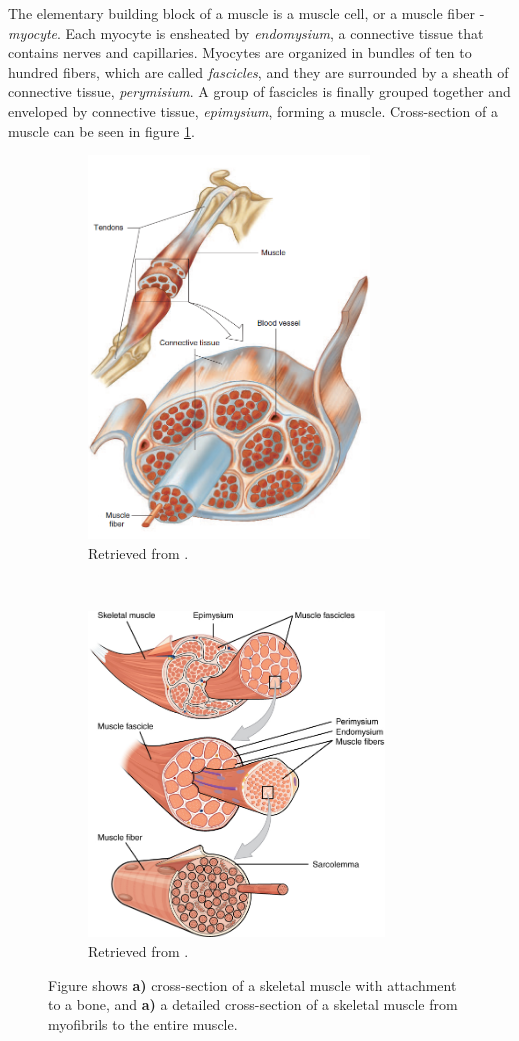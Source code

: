 The elementary building block of a muscle is a muscle cell, or a muscle fiber - \emph{myocyte}. Each myocyte is ensheated by \emph{endomysium}, a connective tissue that contains nerves and capillaries. Myocytes are organized in bundles of ten to hundred fibers, which are called \emph{fascicles}, and they are surrounded by a sheath of connective tissue, \emph{perymisium}. A group of fascicles is finally grouped together and enveloped by connective tissue, \emph{epimysium}, forming a muscle. Cross-section of a muscle can be seen in figure \ref{fig:muscle}.
\begin{figure}[t!]
    \centering
    \begin{subfigure}[t]{0.49\textwidth}
        \centering
        \includegraphics[height=4in]{Images/introduction/muscle.png}
        \caption{Retrieved from \citet{Widmaier2014}.}
    \end{subfigure}%
    ~ 
    \begin{subfigure}[t]{0.49\textwidth}
        \centering
        \includegraphics[height=3.4in]{Images/introduction/Muscle_Fibers.png}
        \caption{Retrieved from \citet{OpenStax2013}.}
    \end{subfigure}
    \caption{Figure shows \textbf{a)} cross-section of a skeletal muscle with attachment to a bone, and \textbf{a)} a detailed cross-section of a skeletal muscle from myofibrils to the entire muscle.}
\label{fig:muscle}
\end{figure}
